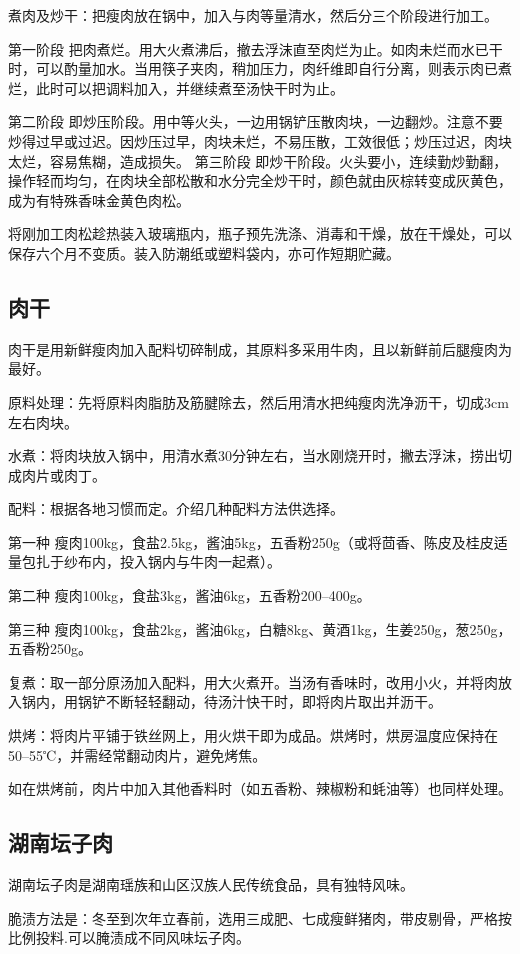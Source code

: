 \documentclass{ctexbook}
\begin{document}
煮肉及炒干：把瘦肉放在锅中，加入与肉等量清水，然后分三个阶段进行加工。

第一阶段 把肉煮烂。用大火煮沸后，撤去浮沫直至肉烂为止。如肉未烂而水已干时，可以酌量加水。当用筷子夹肉，稍加压力，肉纤维即自行分离，则表示肉已煮烂，此时可以把调料加入，并继续煮至汤快干时为止。

第二阶段 即炒压阶段。用中等火头，一边用锅铲压散肉块，一边翻炒。注意不要炒得过早或过迟。因炒压过早，肉块未烂，不易压散，工效很低；炒压过迟，肉块太烂，容易焦糊，造成损失。
第三阶段 即炒干阶段。火头要小，连续勤炒勤翻，操作轻而均匀，在肉块全部松散和水分完全炒干时，颜色就由灰棕转变成灰黄色，成为有特殊香味金黄色肉松。

将刚加工肉松趁热装入玻璃瓶内，瓶子预先洗涤、消毒和干燥，放在干燥处，可以保存六个月不变质。装入防潮纸或塑料袋内，亦可作短期贮藏。
\subsection{肉干}
肉干是用新鲜瘦肉加入配料切碎制成，其原料多采用牛肉，且以新鲜前后腿瘦肉为最好。

原料处理：先将原料肉脂肪及筋腱除去，然后用清水把纯瘦肉洗净沥干，切成3cm左右肉块。

水煮：将肉块放入锅中，用清水煮30分钟左右，当水刚烧开时，撇去浮沫，捞出切成肉片或肉丁。

配料：根据各地习惯而定。介绍几种配料方法供选择。

第一种 瘦肉100kg，食盐2.5kg，酱油5kg，五香粉250g（或将茴香、陈皮及桂皮适量包扎于纱布内，投入锅内与牛肉一起煮）。

第二种 瘦肉100kg，食盐3kg，酱油6kg，五香粉200--400g。

第三种 瘦肉100kg，食盐2kg，酱油6kg，白糖8kg、黄酒1kg，生姜250g，葱250g，五香粉250g。

复煮：取一部分原汤加入配料，用大火煮开。当汤有香味时，改用小火，并将肉放入锅内，用锅铲不断轻轻翻动，待汤汁快干时，即将肉片取出并沥干。

烘烤：将肉片平铺于铁丝网上，用火烘干即为成品。烘烤时，烘房温度应保持在50--55℃，并需经常翻动肉片，避免烤焦。

如在烘烤前，肉片中加入其他香料时（如五香粉、辣椒粉和蚝油等）也同样处理。
\subsection{湖南坛子肉}
湖南坛子肉是湖南瑶族和山区汉族人民传统食品，具有独特风味。

脆渍方法是：冬至到次年立春前，选用三成肥、七成瘦鲜猪肉，带皮剔骨，严格按比例投料.可以腌渍成不同风味坛子肉。
\end{document}

